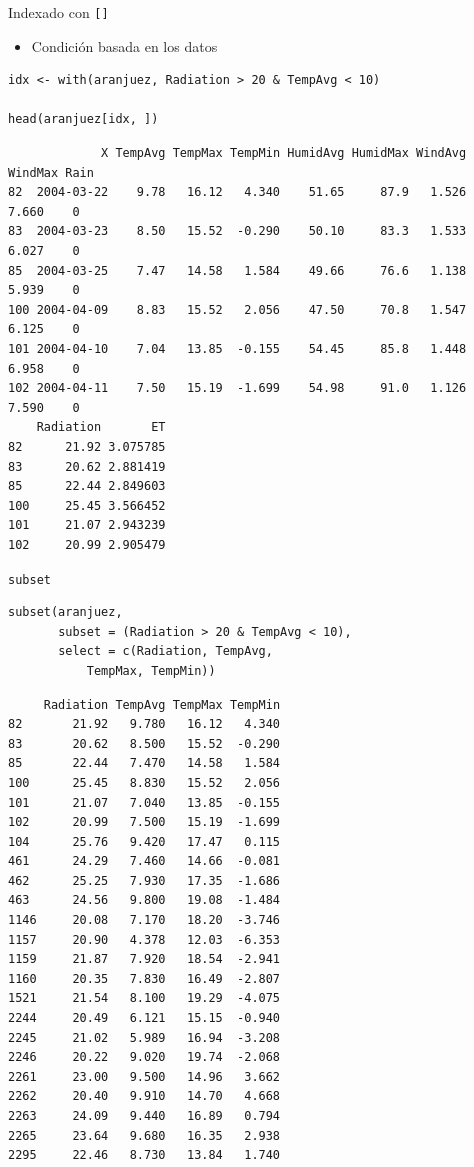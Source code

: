 \documentclass[xcolor={usenames,svgnames,dvipsnames}]{beamer}
\begin{document}
\begin{frame}[fragile,label=sec-5-2-2]{Indexado con \texttt{[]}}
 \begin{itemize}
\item Condición basada en los datos
\end{itemize}
\lstset{language=R,label= ,caption= ,numbers=none}
\begin{lstlisting}
idx <- with(aranjuez, Radiation > 20 & TempAvg < 10) 

head(aranjuez[idx, ])
\end{lstlisting}

\begin{verbatim}
             X TempAvg TempMax TempMin HumidAvg HumidMax WindAvg WindMax Rain
82  2004-03-22    9.78   16.12   4.340    51.65     87.9   1.526   7.660    0
83  2004-03-23    8.50   15.52  -0.290    50.10     83.3   1.533   6.027    0
85  2004-03-25    7.47   14.58   1.584    49.66     76.6   1.138   5.939    0
100 2004-04-09    8.83   15.52   2.056    47.50     70.8   1.547   6.125    0
101 2004-04-10    7.04   13.85  -0.155    54.45     85.8   1.448   6.958    0
102 2004-04-11    7.50   15.19  -1.699    54.98     91.0   1.126   7.590    0
    Radiation       ET
82      21.92 3.075785
83      20.62 2.881419
85      22.44 2.849603
100     25.45 3.566452
101     21.07 2.943239
102     20.99 2.905479
\end{verbatim}
\end{frame}

\begin{frame}[fragile,label=sec-5-2-3]{\texttt{subset}}
 \lstset{language=R,label= ,caption= ,numbers=none}
\begin{lstlisting}
subset(aranjuez,
       subset = (Radiation > 20 & TempAvg < 10),
       select = c(Radiation, TempAvg,
           TempMax, TempMin))
\end{lstlisting}

\begin{verbatim}
     Radiation TempAvg TempMax TempMin
82       21.92   9.780   16.12   4.340
83       20.62   8.500   15.52  -0.290
85       22.44   7.470   14.58   1.584
100      25.45   8.830   15.52   2.056
101      21.07   7.040   13.85  -0.155
102      20.99   7.500   15.19  -1.699
104      25.76   9.420   17.47   0.115
461      24.29   7.460   14.66  -0.081
462      25.25   7.930   17.35  -1.686
463      24.56   9.800   19.08  -1.484
1146     20.08   7.170   18.20  -3.746
1157     20.90   4.378   12.03  -6.353
1159     21.87   7.920   18.54  -2.941
1160     20.35   7.830   16.49  -2.807
1521     21.54   8.100   19.29  -4.075
2244     20.49   6.121   15.15  -0.940
2245     21.02   5.989   16.94  -3.208
2246     20.22   9.020   19.74  -2.068
2261     23.00   9.500   14.96   3.662
2262     20.40   9.910   14.70   4.668
2263     24.09   9.440   16.89   0.794
2265     23.64   9.680   16.35   2.938
2295     22.46   8.730   13.84   1.740
\end{verbatim}
\end{frame}
\end{document}

